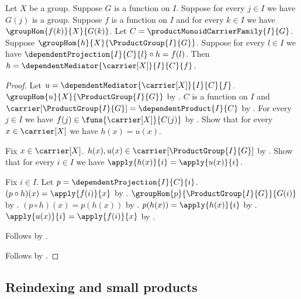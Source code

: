 \begin{theorem}\label{product_group_mediator_unique}
    Let $X$ be a group.
    Suppose $G$ is a function on $I$.
    Suppose for every $j\in I$ we have $G(j)$ is a group.
    Suppose $f$ is a function on $I$ and for every $k\in I$ we have
        $\groupHom{f(k)}{X}{G(k)}$.
    Let $C=\productMonoidCarrierFamily{I}{G}$.
    Suppose $\groupHom{h}{X}{\ProductGroup{I}{G}}$.
    Suppose for every $l\in I$ we have
        $\dependentProjection{I}{C}{l}\circ h=f(l)$.
    Then $h=\dependentMediator{\carrier[X]}{I}{C}{f}$.
\end{theorem}
\begin{proof}
    Let $u=\dependentMediator{\carrier[X]}{I}{C}{f}$.
    $\groupHom{u}{X}{\ProductGroup{I}{G}}$ by
        .
    $C$ is a function on $I$ and
        $\carrier[\ProductGroup{I}{G}]=\dependentProduct{I}{C}$ by
        .
    For every $j\in I$ we have
        $f(j)\in\funs{\carrier[X]}{C(j)}$ by
        .
    Show that for every $x\in\carrier[X]$ we have $h(x)=u(x)$.
    \begin{subproof}
        Fix $x\in\carrier[X]$.
        $h(x),u(x)\in\carrier[\ProductGroup{I}{G}]$ by
            .
        Show that for every $i\in I$ we have
            $\apply{h(x)}{i}=\apply{u(x)}{i}$.
        \begin{subproof}
            Fix $i\in I$.
            Let $p=\dependentProjection{I}{C}{i}$.
            $(p\circ h)(x)=\apply{f(i)}{x}$ by \auto.
            $\groupHom{p}{\ProductGroup{I}{G}}{G(i)}$ by
                .
            $(p\circ h)(x)=p(h(x))$ by
                .
            $p(h(x))=\apply{h(x)}{i}$ by
                .
            $\apply{u(x)}{i}=\apply{f(i)}{x}$ by
                .
        \end{subproof}
        Follows by .
    \end{subproof}
    Follows by .
\end{proof}

\subsection{Reindexing and small products}

